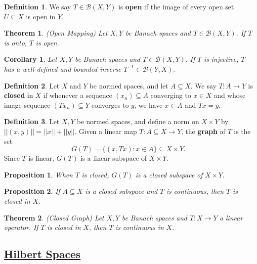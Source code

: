 \documentclass[11pt]{amsart}
\newtheorem*{theorem*}{Theorem}
\newtheorem*{proposition*}{Proposition}
\newtheorem*{corollary*}{Corollary}
\theoremstyle{definition}
\newtheorem*{definition*}{Definition}
\renewcommand\:{\colon}
\newcommand{\calB}{\mathcal{B}}
\begin{document}
\begin{definition*}
	We say $T \in \calB(X, Y)$ is \textbf{open} if the image of every open set $U \subseteq X$ is open in $Y$.
\end{definition*}

\begin{theorem*}
	\textnormal{(Open Mapping)} Let $X, Y$ be Banach spaces and $T \in \calB(X,Y)$. If $T$ is onto, $T$ is open.
\end{theorem*}

\begin{corollary*}
	Let $X, Y$ be Banach spaces and $T \in \calB(X,Y)$. If $T$ is injective, $T$ has a well-defined and bounded inverse $T^{-1} \in \calB(Y,X)$.
\end{corollary*}

\begin{definition*}
	Let $X$ and $Y$ be normed spaces, and let $A \subseteq X$. We say $T\: A \to Y$ is \textbf{closed} in $X$ if whenever a sequence $(x_n) \subseteq A$ converging to $x \in X$ and whose image sequence $(Tx_n) \subseteq Y$ converges to $y$, we have $x \in A$ and $Tx = y$.
\end{definition*}

\begin{definition*}
	Let $X, Y$ be normed spaces, and define a norm on $X \times Y$ by $||(x,y)|| = ||x|| + ||y||$. Given a linear map $T\: A \subseteq X \to Y$, the \textbf{graph} of $T$ is the set
		\[ G(T) = \{ (x, Tx) : x \in A\} \subseteq X \times Y. \]
	Since $T$ is linear, $G(T)$ is a linear subspace of $X \times Y$.
\end{definition*}

\begin{proposition*}
	When $T$ is closed, $G(T)$ is a closed subspace of $X \times Y$.
\end{proposition*}

\begin{proposition*}
	If $A \subseteq X$ is a closed subspace and $T$ is continuous, then $T$ is closed in $X$.
\end{proposition*}

\begin{theorem*}
	\textnormal{(Closed Graph)} Let $X, Y$ be Banach spaces and $T \: X \to Y$ a linear operator. If $T$ is closed in $X$, then $T$ is continuous in $X$.
\end{theorem*}
\vskip20pt



\subsection*{\underline{Hilbert Spaces}}
\end{document}
